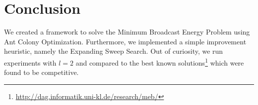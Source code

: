 \documentclass{article}
\theoremstyle{definition}
\begin{document}
\section{Conclusion}

We created a framework to solve the Minimum Broadcast Energy Problem using Ant Colony Optimization. Furthermore, we implemented a simple improvement heuristic, namely the Expanding Sweep Search. Out of curiosity, we run experiments with $l=2$ and compared to the best known solutions\footnote{\url{http://dag.informatik.uni-kl.de/research/meb/}} which were found to be competitive.



\end{document}
